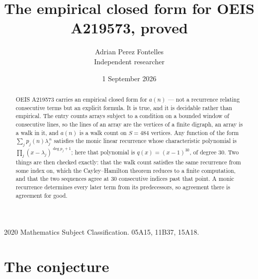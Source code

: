 \documentclass[11pt,a4paper]{article}
\title{The empirical closed form for OEIS A219573, proved}
\author{Adrian Perez Fontelles\\ \small Independent researcher}
\date{1 September 2026}
\theoremstyle{plain}
\theoremstyle{definition}
\begin{document}
\maketitle

\begin{abstract}
OEIS A219573 carries an empirical closed form for $a(n)$ --- not a recurrence relating
consecutive terms but an explicit formula. It is true, and it is decidable rather than
empirical. The entry counts arrays subject to a condition on a bounded window of consecutive lines, so the lines of an array are the
vertices of a finite digraph, an array is a walk in it, and $a(n)$ is a walk count on
$S=484$ vertices. Any function of the form $\sum_j p_j(n)\lambda_j^{\,n}$ satisfies the
monic linear recurrence whose characteristic polynomial is
$\prod_j(x-\lambda_j)^{\deg p_j+1}$; here that polynomial is $q(x)=(x-1)^{30}$, of degree
$30$. Two things are then checked exactly: that the walk count satisfies the same
recurrence from some index on, which the Cayley--Hamilton theorem reduces to a finite
computation, and that the two sequences agree at $30$ consecutive indices past that
point. A monic recurrence determines every later term from its predecessors, so agreement
there is agreement for good.
\end{abstract}

\noindent\small 2020 Mathematics Subject Classification. 05A15, 11B37, 15A18.\normalsize

\section{The conjecture}
\end{document}
